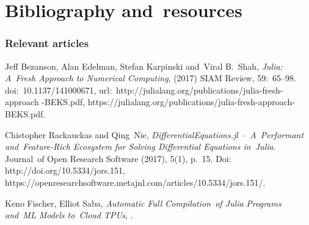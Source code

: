 \documentclass[10pt,t]{beamer}
\begin{document}
\section{Bibliography and~resources}



\begin{frame}
  \frametitle{Relevant articles}


  Jeff Bezanson, Alan Edelman, Stefan Karpinski and~Viral B.~Shah,
  \textit{Julia: A~Fresh Approach to Numerical Computing}, (2017) SIAM
  Review, 59:~65--98. doi:~10.1137/141000671,
  url:~http://julialang.org/publications/julia-fresh-approach
  -BEKS.pdf,
  {https://julialang.org/publications/julia-fresh-approach-BEKS.pdf}.

  \vspace{0.3em}



  Chistopher Rackauckas and Qing~Nie, \textit{DifferentialEquations.jl
    --~A~Performant and~Feature-Rich Ecosystem for Solving Differential
    Equations in~Julia}. Journal~of Open Research Software (2017),
  5(1), p.~15. Doi: http://doi.org/10.5334/jors.151,
  {https://openresearchsoftware.metajnl.com/articles/10.5334/jors.151/}.

  \vspace{0.3em}



  Keno Fischer, Elliot Saba, \textit{Automatic Full Compilation~of
    Julia Programs and~ML Models to~Cloud TPUs},
  .

\end{frame}
\end{document}
